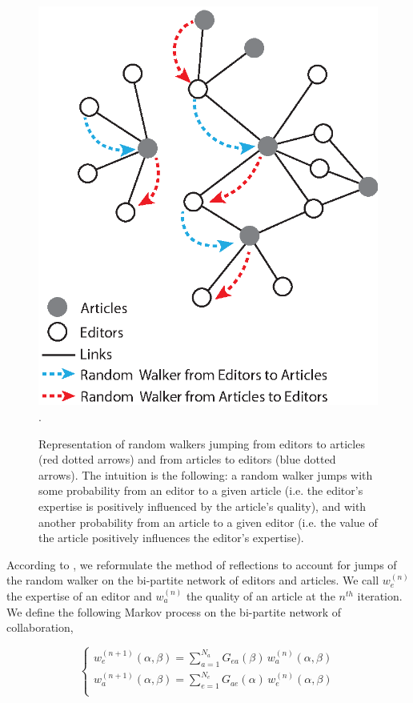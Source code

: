 \begin{figure}[!t]
\centering
\includegraphics[width=0.7\columnwidth]{../Figures/bi-partite_net.eps}.
\caption{Representation of random walkers jumping from editors to articles (red dotted arrows) and from articles to editors (blue dotted arrows). The intuition is the following: a random walker jumps with some probability from an editor to a given article (i.e. the editor's expertise is positively influenced by the article's quality), and with another probability from an article to a given editor (i.e. the value of the article positively influences the editor's expertise).}
\label{fig:jumpers}
\end{figure}

According to  \cite{caldarelli2012network}, we reformulate the method of reflections to account for jumps of the random walker on the bi-partite network of editors and articles. We call $w^{(n)}_e$ the expertise of an editor and $w^{(n)}_a$ the quality of an article at the $n^{th}$ iteration. We define the following Markov process on the bi-partite network of collaboration, 

\begin{equation}
\begin{cases}
w^{(n+1)}_e (\alpha,\beta) = \sum_{a=1}^{N_a}  G_{ea}(\beta) \,w^{(n)}_a (\alpha,\beta)\\[7pt]
w^{(n+1)}_a (\alpha,\beta) = \sum_{e=1}^{N_e}  G_{ae}(\alpha) \, w^{(n)}_e (\alpha,\beta)\\
\end{cases}
\label{random_walker}
\end{equation}

